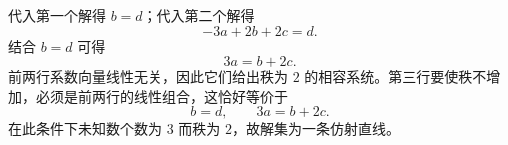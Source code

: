 \begin{solution}
代入第一个解得 $b=d$；代入第二个解得
\begin{equation}
 -3a+2b+2c=d.
\end{equation}
结合 $b=d$ 可得
\begin{equation}
 3a=b+2c.
\end{equation}
前两行系数向量线性无关，因此它们给出秩为 $2$ 的相容系统。第三行要使秩不增加，必须是前两行的线性组合，这恰好等价于
\begin{equation}
 b=d,
 \qquad 3a=b+2c.
\end{equation}
在此条件下未知数个数为 $3$ 而秩为 $2$，故解集为一条仿射直线。
\end{solution}

